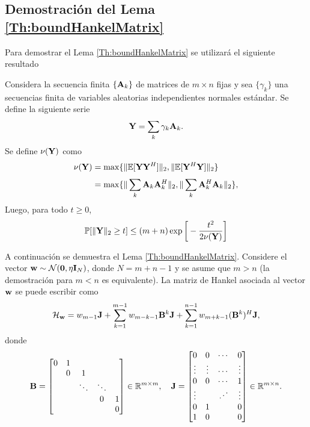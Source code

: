	\subsection{Demostración del Lema \ref{Th:boundHankelMatrix}}\label{Proof:BoundHankelMatrix}

	Para demostrar el Lema \ref{Th:boundHankelMatrix} se utilizará el siguiente resultado
	\begin{lemma}\cite[Chap. 4]{tropp2015}\label{lemma:RandomMatrixIneq}
	Considera la secuencia finita $\{\mathbf{A}_k\}$ de matrices de $m\times n$ fijas y sea $\{\gamma_k\}$ una secuencias finita de variables aleatorias independientes normales estándar. Se define la siguiente serie
	\begin{equation}
		\mathbf{Y} = \sum_k\gamma_k\mathbf{A}_k.
		\label{Eq:GaussSeries}
	\end{equation}
	Se define $\nu(\mathbf{Y})$  como 
	\begin{equation}
		\begin{aligned} 
			\nu(\mathbf{Y}) & = \max\{\|\mathbb{E}[\mathbf{Y}\mathbf{Y}^H]\|_2,\|\mathbb{E}[\mathbf{Y}^H\mathbf{Y}]\|_2\}\\[0.3em]
			& = \max\{\|\sum_k\mathbf{A}_k\mathbf{A}_k^H\|_2,\|\sum_k\mathbf{A}_k^H\mathbf{A}_k\|_2\},
		\end{aligned}
	\end{equation}
	Luego, para todo $t\geq 0$,
	\begin{equation}
		\mathbb{P}[\|\mathbf{Y}\|_2\geq t]\leq (m+n)\exp\bigg[-\frac{t^2}{2\nu(\mathbf{Y})}\bigg]
		\label{Eq:boundGaussSeries}
	\end{equation}						
\end{lemma}

A continuación se demuestra el Lema \ref{Th:boundHankelMatrix}. Considere el vector $\mathbf{w}\sim\mathcal{N}(\mathbf{0},\eta\mathbf{I}_{N})$, donde $N = m+n-1$ y se asume que $m>n$ (la demostración para $m<n$ es equivalente). La matriz de Hankel asociada al vector $\mathbf{w}$ se puede escribir como																
\begin{equation}
	\mathcal{H}_{\mathbf{w}} = w_{m-1}\mathbf{J} + \sum_{k=1}^{m-1}
	w_{m-k-1}\mathbf{B}^k\mathbf{J} + \sum_{k=1}^{n-1}w_{m+k-1}(\mathbf{B}^k)^H\mathbf{J},
	\label{Eq:HankExpression}
\end{equation}
donde 
\[\matB = \begin{bmatrix} 0 & 1 & 		  &        &  \\
	& 0 & 1      &        &  \\
	&   & \ddots & \ddots &   \\
	&   &        &  0     & 1 \\
	&   &        &        & 0
\end{bmatrix}\in\R^{m\times m}, \quad 
\matJ = \begin{bmatrix} 0      & 0 & \cdots & 0 \\
						\vdots     & \vdots & \cdots & \vdots \\
						0      & 0 & \cdots & 1 \\
						\vdots &   & \reflectbox{$\ddots$} & \vdots \\
						0      & 1 &        & 0\\
						1      & 0 &        & 0
\end{bmatrix}\in\R^{m\times n}.\]

